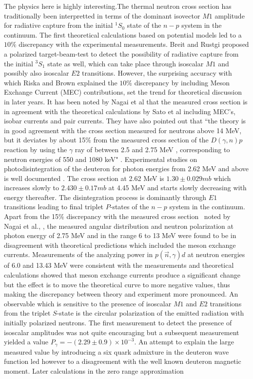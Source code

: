 The physics here is highly interesting.The thermal neutron cross section \cite{key22} has traditionally been interpretted in terms of the dominant isovector $M1$ amplitude for radiative capture from the initial $^1S_0$ state of the $n-p$ system in the continuum. The first theoretical calculations \cite{key23} based on potential models led to a $10\%$ discrepancy with the experimental measurements. Breit and Rustgi \cite{key24} proposed a polarized target-beam-test to detect the possibility of radiative capture from the initial $^3S_1$ state as well, which can take place through isoscalar $M1$ and possibly also isoscalar $E2$ transitions. However, the surprising accuracy with which Riska and Brown \cite{key25} explained the $10\%$ discrepancy by including Meson Exchange Current (MEC) contributions, set the trend for theoretical discussion in later years. It has been noted by Nagai et al \cite{key21} that the measured cross section is in agreement with the theoretical calculations by Sato et al \cite{key26} including MEC's, isobar currents and pair currents. They have also pointed out that ``the theory is in good agreement with the cross section measured for neutrons above 14 MeV, but it deviates by about 15$\%$ from the measured cross section of the $D(\gamma,n)p$ reaction by using the $\gamma$ ray of between 2.5 and 2.75 MeV \cite{key27}, corresponding to neutron energies of 550 and 1080 keV" \cite{key21}. Experimental studies on photodisintegration of the deuteron for photon energies from 2.62 MeV and above is well documented  \cite{28}. The cross section at 2.62 MeV is $1.30\pm 0.029 mb$ which increases slowly to $2.430 \pm 0.17 mb$ at 4.45 MeV and starts slowly decreasing with energy thereafter. The disintegration process is dominantly through $E1$ transitions leading to final triplet $P$-states of the $n-p$ system in the continuum. Apart from the 15$\%$ discrepancy with the measured cross section~\cite{key27} noted by Nagai et al., \cite{key21}, the measured angular distribution and neutron polarization at photon energy of 2.75 MeV \cite{key29} and in the range 6 to 13 MeV \cite{key30} were found to be in disagreement with theoretical predictions which included the meson exchange currents. Measurements of the analyzing power \cite{key31} in $p(\vec n, \gamma)d$ at neutron energies of 6.0 and 13.43 MeV were consistent with the measurements \cite{key30} and theoretical calculations \cite{key32} showed that meson exchange currents produce a significant change but the effect is to move the theoretical curve to more negative values, thus making the discrepancy between theory and experiment more pronounced. An observable which is sensitive to the presence of isoscalar $M1$ and $E2$ transitions from the triplet $S$-state is the circular polarization of the emitted radiation with initially polarized neutrons. The first measurement \cite{key33} to detect the presence of isoscalar amplitudes was not quite encouraging but a subsequent measurement \cite{key34} yielded a value $P_\gamma= -(2.29 \pm 0.9)\times 10^{-3}$. An attempt \cite{key35} to explain the large measured value by introducing a six quark admixture in the deuteron wave function led however to a disagreement with the well known deuteron magnetic moment. Later calculations \cite{key36} in the zero range approximation 
